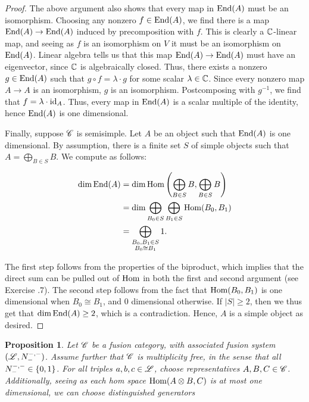 \documentclass{article}
\newtheorem{proposition}{Proposition}[section]
\theoremstyle{definition}
\numberwithin{figure}{section}
\begin{document}
\begin{enumerate}[\thesection .1.]
\begin{proof}
The above argument also shows that every map in $\mathrm{End}(A)$ must be an isomorphism. Choosing any nonzero $f\in \mathrm{End}(A)$, we find there is a map $\mathrm{End}(A)\to \mathrm{End}(A)$ induced by precomposition with $f$. This is clearly a $\mathbb{C}$-linear map, and seeing as $f$ is an isomorphism on $V$ it must be an isomorphism on $\mathrm{End}(A)$. Linear algebra tells us that this map $\mathrm{End}(A)\to \mathrm{End}(A)$ must have an eigenvector, since $\mathbb{C}$ is algebraically closed. Thus, there exists a nonzero $g\in \mathrm{End}(A)$ such that $g\circ f=\lambda \cdot g$ for some scalar $\lambda\in \mathbb{C}$. Since every nonzero map $A\to A$ is an isomorphism, $g$ is an isomorphism. Postcomposing with $g^{-1}$, we find that $f=\lambda \cdot\mathrm{id}_A$. Thus, every map in $\mathrm{End}(A)$ is a scalar multiple of the identity, hence $\mathrm{End}(A)$ is one dimensional.

Finally, suppose $\mathscr{C}$ is semisimple. Let $A$ be an object such that $\mathrm{End}(A)$ is one dimensional. By assumption, there is a finite set $S$ of simple objects such that $A=\bigoplus_{B\in S}B$. We compute as follows:

\begin{align*}
\dim \mathrm{End}(A)&=\dim \mathrm{Hom}\left(\bigoplus_{B\in S}B,\bigoplus_{B\in S} B\right)\\
&=\dim \bigoplus_{B_0 \in S}\bigoplus_{B_1\in S}\mathrm{Hom}(B_0,B_1)\\
&=\bigoplus_{\substack{B_0,B_1\in S \\ B_0\cong B_1}}1.
\end{align*}

The first step follows from the properties of the biproduct, which implies that the direct sum can be pulled out of $\mathrm{Hom}$ in both the first and second argument (see Exercise \thesection.7). The second step follows from the fact that $\mathrm{Hom}(B_0,B_1)$ is one dimensional when $B_0\cong B_1$, and $0$ dimensional otherwise. If $|S|\geq 2$, then we thus get that $\dim \mathrm{End}(A)\geq 2$, which is a contradiction. Hence, $A$ is a simple object as desired.
\end{proof}

\begin{proposition}\label{Make 6j system} Let $\mathscr{C}$ be a fusion category, with associated fusion system $(\mathscr{L},N^{\--,\--}_{\--})$. Assume further that $\mathscr{C}$ is multiplicity free, in the sense that all $N^{\--,\--}_{\--}\in\{0,1\}$. For all triples $a,b,c\in \mathscr{L}$, choose representatives $A,B,C\in \mathscr{C}$. Additionally, seeing as each hom space $\mathrm{Hom}(A\otimes B, C)$ is at most one dimensional, we can choose distinguished generators



\end{proposition}
\end{enumerate}
\end{document}

